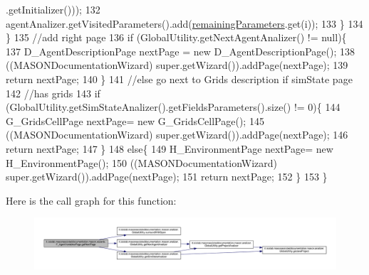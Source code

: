 \begin{DoxyCode}
      .getInitializer()));
132                 agentAnalizer.getVisitedParameters().add(\hyperlink{classit_1_1isislab_1_1masonassisteddocumentation_1_1mason_1_1wizards_1_1_f___agent_variables_page_a84c4e7c9e38a660e5befa94f5cac893f}{remainingParameters}.get(i));
133             \}
134         \}
135         \textcolor{comment}{//add right page}
136         \textcolor{keywordflow}{if} (GlobalUtility.getNextAgentAnalizer() != null)\{
137             D\_AgentDescriptionPage nextPage = \textcolor{keyword}{new} D\_AgentDescriptionPage();
138             ((MASONDocumentationWizard) super.getWizard()).addPage(nextPage);
139             \textcolor{keywordflow}{return} nextPage;
140         \}
141         \textcolor{comment}{//else go next to Grids description if simState page}
142         \textcolor{comment}{//has grids}
143         \textcolor{keywordflow}{if} (GlobalUtility.getSimStateAnalizer().getFieldsParameters().size() != 0)\{
144             G\_GridsCellPage nextPage= \textcolor{keyword}{new} G\_GridsCellPage();
145             ((MASONDocumentationWizard) super.getWizard()).addPage(nextPage); 
146             \textcolor{keywordflow}{return} nextPage; 
147         \}
148         \textcolor{keywordflow}{else}\{
149             H\_EnvironmentPage nextPage= \textcolor{keyword}{new} H\_EnvironmentPage();
150             ((MASONDocumentationWizard) super.getWizard()).addPage(nextPage); 
151             \textcolor{keywordflow}{return} nextPage; 
152         \}
153     \}
\end{DoxyCode}


Here is the call graph for this function\-:
\nopagebreak
\begin{figure}[H]
\begin{center}
\leavevmode
\includegraphics[width=350pt]{classit_1_1isislab_1_1masonassisteddocumentation_1_1mason_1_1wizards_1_1_f___agent_variables_page_ad80f8e1ea42919b04a60b5e3dd52fd95_cgraph}
\end{center}
\end{figure}


